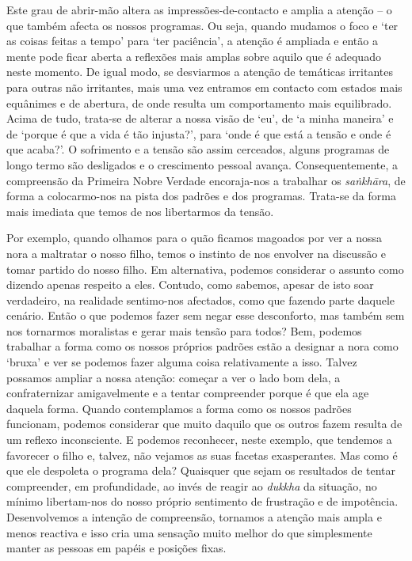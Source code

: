 Este grau de abrir-mão altera as impressões-de-contacto e amplia a atenção -- o que também afecta os nossos programas. Ou seja, quando mudamos o foco e `ter as coisas feitas a tempo' para `ter paciência', a atenção é ampliada e então a mente pode ficar aberta a reflexões mais amplas sobre aquilo que é adequado neste momento. De igual modo, se desviarmos a atenção de temáticas irritantes para outras não irritantes, mais uma vez entramos em contacto com estados mais equânimes e de abertura, de onde resulta um comportamento mais equilibrado. Acima de tudo, trata-se de alterar a nossa visão de `eu', de `a minha maneira' e de `porque é que a vida é tão injusta?', para `onde é que está a tensão e onde é que acaba?'. O sofrimento e a tensão são assim cerceados, alguns programas de longo termo são desligados e o crescimento pessoal avança. Consequentemente, a compreensão da Primeira Nobre Verdade encoraja-nos a trabalhar os \emph{saṅkhāra}, de forma a colocarmo-nos na pista dos padrões e dos programas. Trata-se da forma mais imediata que temos de nos libertarmos da tensão.

Por exemplo, quando olhamos para o quão ficamos magoados por ver a nossa nora a maltratar o nosso filho, temos o instinto de nos envolver na discussão e tomar partido do nosso filho. Em alternativa, podemos considerar o assunto como dizendo apenas respeito a eles. Contudo, como sabemos, apesar de isto soar verdadeiro, na realidade sentimo-nos afectados, como que fazendo parte daquele cenário. Então o que podemos fazer sem negar esse desconforto, mas também sem nos tornarmos moralistas e gerar mais tensão para todos? Bem, podemos trabalhar a forma como os nossos próprios padrões estão a designar a nora como `bruxa' e ver se podemos fazer alguma coisa relativamente a isso. Talvez possamos ampliar a nossa atenção: começar a ver o lado bom dela, a confraternizar amigavelmente e a tentar compreender porque é que ela age daquela forma. Quando contemplamos a forma como os nossos padrões funcionam, podemos considerar que muito daquilo que os outros fazem resulta de um reflexo inconsciente. E podemos reconhecer, neste exemplo, que tendemos a favorecer o filho e, talvez, não vejamos as suas facetas exasperantes. Mas como é que ele despoleta o programa dela? Quaisquer que sejam os resultados de tentar compreender, em profundidade, ao invés de reagir ao \emph{dukkha} da situação, no mínimo libertam-nos do nosso próprio sentimento de frustração e de impotência. Desenvolvemos a intenção de compreensão, tornamos a atenção mais ampla e menos reactiva e isso cria uma sensação muito melhor do que simplesmente manter as pessoas em papéis e posições fixas.

